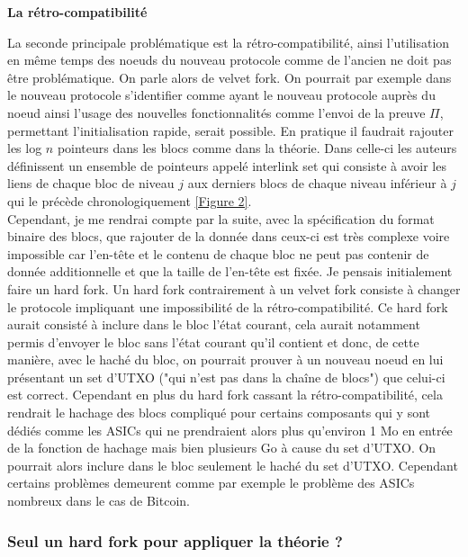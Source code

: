 \documentclass[12pt,a4paper]{article}
\newcommand{\annexe}[2]{\hyperlink{#1}{[Figure #2]}}
\begin{document}
	\textbf{La rétro-compatibilité\\}
	
	La seconde principale problématique est la rétro-compatibilité, ainsi l'utilisation en même temps des noeuds du nouveau protocole comme de l'ancien ne doit pas être problématique. On parle alors de velvet fork. On pourrait par exemple dans le nouveau protocole s'identifier comme ayant le nouveau protocole auprès du noeud ainsi l'usage des nouvelles fonctionnalités comme l'envoi de la preuve $\Pi$, permettant l'initialisation rapide, serait possible. En pratique il faudrait rajouter les log $n$ pointeurs dans les blocs comme dans la théorie. Dans celle-ci les auteurs définissent un ensemble de pointeurs appelé interlink set qui consiste à avoir les liens de chaque bloc de niveau $j$ aux derniers blocs de chaque niveau inférieur à $j$ qui le précède chronologiquement \annexe{22}{2}.\\ %
	Cependant, je me rendrai compte par la suite, avec la spécification du format binaire des blocs, que rajouter de la donnée dans ceux-ci est très complexe voire impossible car l'en-tête et le contenu de chaque bloc ne peut pas contenir de donnée additionnelle et que la taille de l'en-tête est fixée. Je pensais initialement faire un hard fork. Un hard fork contrairement à un velvet fork consiste à changer le protocole impliquant une impossibilité de la rétro-compatibilité. Ce hard fork aurait consisté à inclure dans le bloc l'état courant, cela aurait notamment permis d'envoyer le bloc sans l'état courant qu'il contient et donc, de cette manière, avec le haché du bloc, on pourrait prouver à un nouveau noeud en lui présentant un set d'UTXO ("qui n'est pas dans la chaîne de blocs") que celui-ci est correct. Cependant en plus du hard fork cassant la rétro-compatibilité, cela rendrait le hachage des blocs compliqué pour certains composants qui y sont dédiés comme les ASICs qui ne prendraient alors plus qu'environ 1 Mo en entrée de la fonction de hachage mais bien plusieurs Go à cause du set d'UTXO. %
	On pourrait alors inclure dans le bloc seulement le haché du set d'UTXO. Cependant certains problèmes demeurent comme par exemple le problème des ASICs nombreux dans le cas de Bitcoin.
	
	\subsubsection{Seul un hard fork pour appliquer la théorie ?}
	
\end{document}
